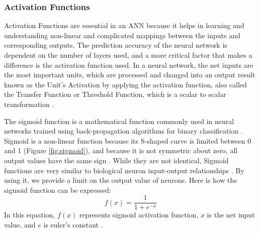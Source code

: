 \documentclass[12pt]{diazessay}
\newcounter{subsubsubsection}[subsubsection]
\begin{document}
    \subsubsection{Activation Functions}
    \hspace{0.7cm} Activation Functions are essential in an ANN because it helps in learning and understanding non-linear and complicated mappings between the inputs and corresponding outputs. The prediction accuracy of the neural network is dependent on the number of layers used, and a more critical factor that makes a difference is the
    activation function used. In a neural network, the net inputs are the most important units, which are processed and changed into an output result known as the Unit’s Activation by applying the activation function, also called the Transfer Function or Threshold Function, which is a scalar to scalar transformation \cite{sharma2017activation}.
    
    \hspace{0.7cm} The sigmoid function is a mathematical function commonly used in neural networks trained using back-propagation algorithms for binary classification \cite{sharma2017activation}\cite{jamel2012implementation}. 
    Sigmoid is a non-linear function because its S-shaped curve is limited between 0 and 1 (Figure \ref{fig:sigmoid}), and because it is not symmetric about zero, all output values have the same sign \cite{sharma2017activation} \cite{balaji2013design}.
     While they are not identical, Sigmoid functions are very similar to biological neuron input-output relationships \cite{balaji2013design}. By using it, we provide a limit on the output value of neurons. Here is how the sigmoid function can be expressed:
    \begin{equation*}
        f(x)=\frac{1}{1+ e^{-x}} 
    \end{equation*}
    In this equation, $f(x)$ represents sigmoid activation function, $x$ is the net input value, and $e$ is euler's constant \cite{jamel2012implementation}. 
\end{document}
